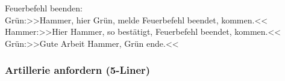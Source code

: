 	Feuerbefehl beenden: \\

	 Grün:>>Hammer, hier Grün, melde Feuerbefehl beendet, kommen.<< \\
	 Hammer:>>Hier Hammer, so bestätigt, Feuerbefehl beendet, kommen.<< \\
	 Grün:>>Gute Arbeit Hammer, Grün ende.<< \\



\subsubsection{Artillerie anfordern (5-Liner)}
